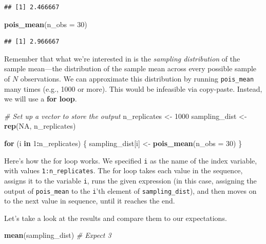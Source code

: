 \documentclass[
  12pt,
  oneside,openany]{book}
\newenvironment{Shaded}{\begin{snugshade}}{\end{snugshade}}
\newcommand{\CommentTok}[1]{\textcolor[rgb]{0.56,0.35,0.01}{\textit{#1}}}
\newcommand{\ControlFlowTok}[1]{\textcolor[rgb]{0.13,0.29,0.53}{\textbf{#1}}}
\newcommand{\DataTypeTok}[1]{\textcolor[rgb]{0.13,0.29,0.53}{#1}}
\newcommand{\DecValTok}[1]{\textcolor[rgb]{0.00,0.00,0.81}{#1}}
\newcommand{\KeywordTok}[1]{\textcolor[rgb]{0.13,0.29,0.53}{\textbf{#1}}}
\newcommand{\NormalTok}[1]{#1}
\newcommand{\OperatorTok}[1]{\textcolor[rgb]{0.81,0.36,0.00}{\textbf{#1}}}
\newcommand{\OtherTok}[1]{\textcolor[rgb]{0.56,0.35,0.01}{#1}}
\newcommand{\StringTok}[1]{\textcolor[rgb]{0.31,0.60,0.02}{#1}}
\begin{document}
\begin{verbatim}
## [1] 2.466667
\end{verbatim}

\begin{Shaded}
\begin{Highlighting}[]
\KeywordTok{pois\_mean}\NormalTok{(}\DataTypeTok{n\_obs =} \DecValTok{30}\NormalTok{)}
\end{Highlighting}
\end{Shaded}

\begin{verbatim}
## [1] 2.966667
\end{verbatim}

Remember that what we're interested in is the \emph{sampling distribution} of the sample mean---the distribution of the sample mean across every possible sample of \(N\) observations. We can approximate this distribution by running \texttt{pois\_mean} many times (e.g., 1000 or more). This would be infeasible via copy-paste. Instead, we will use a \textbf{for loop}.

\begin{Shaded}
\begin{Highlighting}[]
\CommentTok{\# Set up a vector to store the output}
\NormalTok{n\_replicates <{-}}\StringTok{ }\DecValTok{1000}
\NormalTok{sampling\_dist <{-}}\StringTok{ }\KeywordTok{rep}\NormalTok{(}\OtherTok{NA}\NormalTok{, n\_replicates)}

\ControlFlowTok{for}\NormalTok{ (i }\ControlFlowTok{in} \DecValTok{1}\OperatorTok{:}\NormalTok{n\_replicates) \{}
\NormalTok{  sampling\_dist[i] <{-}}\StringTok{ }\KeywordTok{pois\_mean}\NormalTok{(}\DataTypeTok{n\_obs =} \DecValTok{30}\NormalTok{)}
\NormalTok{\}}
\end{Highlighting}
\end{Shaded}

Here's how the for loop works. We specified \texttt{i} as the name of the index variable, with values \texttt{1:n\_replicates}. The for loop takes each value in the sequence, assigns it to the variable \texttt{i}, runs the given expression (in this case, assigning the output of \texttt{pois\_mean} to the \texttt{i}'th element of \texttt{sampling\_dist}), and then moves on to the next value in sequence, until it reaches the end.

Let's take a look at the results and compare them to our expectations.

\begin{Shaded}
\begin{Highlighting}[]
\KeywordTok{mean}\NormalTok{(sampling\_dist)  }\CommentTok{\# Expect 3}
\end{Highlighting}
\end{Shaded}
\end{document}
